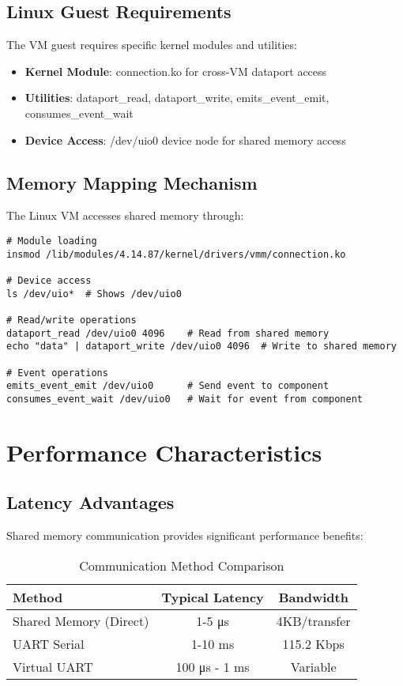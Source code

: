 \documentclass[12pt,a4paper]{article}
\begin{document}
\subsection{Linux Guest Requirements}

The VM guest requires specific kernel modules and utilities:

\begin{itemize}
\item \textbf{Kernel Module}: connection.ko for cross-VM dataport access
\item \textbf{Utilities}: dataport\_read, dataport\_write, emits\_event\_emit, consumes\_event\_wait
\item \textbf{Device Access}: /dev/uio0 device node for shared memory access
\end{itemize}

\subsection{Memory Mapping Mechanism}

The Linux VM accesses shared memory through:

\begin{lstlisting}[style=bash, caption=Memory access pattern]
# Module loading
insmod /lib/modules/4.14.87/kernel/drivers/vmm/connection.ko

# Device access
ls /dev/uio*  # Shows /dev/uio0

# Read/write operations
dataport_read /dev/uio0 4096    # Read from shared memory
echo "data" | dataport_write /dev/uio0 4096  # Write to shared memory

# Event operations
emits_event_emit /dev/uio0      # Send event to component
consumes_event_wait /dev/uio0   # Wait for event from component
\end{lstlisting}

\section{Performance Characteristics}

\subsection{Latency Advantages}

Shared memory communication provides significant performance benefits:

\begin{table}[htbp]
\centering
\caption{Communication Method Comparison}
\label{tab:comparison}
\begin{tabular}{@{}lcc@{}}
\toprule
Method & Typical Latency & Bandwidth \\
\midrule
Shared Memory (Direct) & 1-5 μs & 4KB/transfer \\
UART Serial & 1-10 ms & 115.2 Kbps \\
Virtual UART & 100 μs - 1 ms & Variable \\
\bottomrule
\end{tabular}
\end{table}
\end{document}
